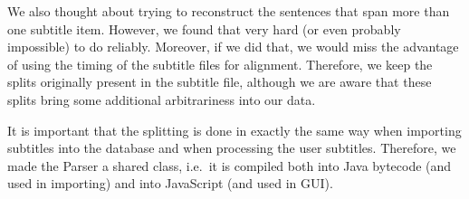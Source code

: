 We also thought about trying to reconstruct the sentences that span more than one subtitle item. However, we found that very hard (or even probably impossible) to do reliably. Moreover, if we did that, we would miss the advantage of using the timing of the subtitle files for alignment. Therefore, we keep the splits originally present in the subtitle file, although we are aware that these splits bring some additional arbitrariness into our data.

It is important that the splitting is done in exactly the same way when importing subtitles into the database and when processing the user subtitles. Therefore, we made the Parser a shared class, i.e.\ it is compiled both into Java bytecode (and used in importing) and into JavaScript (and used in GUI).

%
%
%

